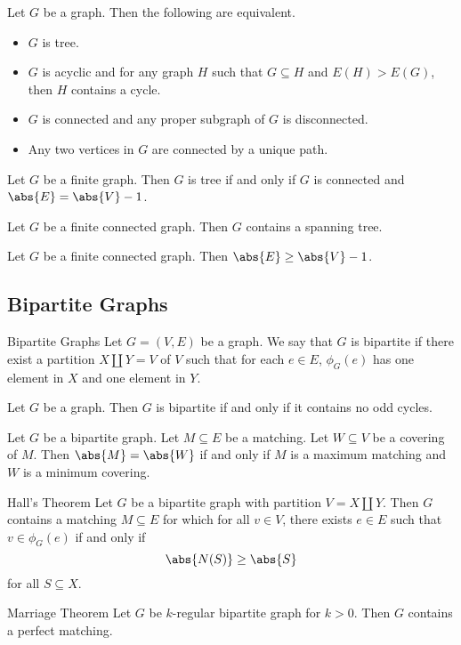 \documentclass[a4paper]{article}
\begin{document}
\begin{prp}{}{} Let $G$ be a graph. Then the following are equivalent. 
\begin{itemize}
\item $G$ is tree. 
\item $G$ is acyclic and for any graph $H$ such that $G\subseteq H$ and $E(H)>E(G)$, then $H$ contains a cycle. 
\item $G$ is connected and any proper subgraph of $G$ is disconnected. 
\item Any two vertices in $G$ are connected by a unique path. 
\end{itemize}
\end{prp}

\begin{lmm}{}{} Let $G$ be a finite graph. Then $G$ is tree if and only if $G$ is connected and $\abs{E}=\abs{V}-1$. 
\end{lmm}

\begin{prp}{}{} Let $G$ be a finite connected graph. Then $G$ contains a spanning tree. 
\end{prp}

\begin{lmm}{}{} Let $G$ be a finite connected graph. Then $\abs{E}\geq\abs{V}-1$. 
\end{lmm}

\subsection{Bipartite Graphs}
\begin{defn}{Bipartite Graphs}{} Let $G=(V,E)$ be a graph. We say that $G$ is bipartite if there exist a partition $X\amalg Y=V$ of $V$ such that for each $e\in E$, $\phi_G(e)$ has one element in $X$ and one element in $Y$. 
\end{defn}

\begin{prp}{}{} Let $G$ be a graph. Then $G$ is bipartite if and only if it contains no odd cycles. 
\end{prp}

\begin{prp}{}{} Let $G$ be a bipartite graph. Let $M\subseteq E$ be a matching. Let $W\subseteq V$ be a covering of $M$. Then $\abs{M}=\abs{W}$ if and only if $M$ is a maximum matching and $W$ is a minimum covering. 
\end{prp}

\begin{thm}{Hall's Theorem}{} Let $G$ be a bipartite graph with partition $V=X\amalg Y$. Then $G$ contains a matching $M\subseteq E$ for which for all $v\in V$, there exists $e\in E$ such that $v\in\phi_G(e)$ if and only if $$\abs{N(S)}\geq\abs{S}$$ for all $S\subseteq X$. 
\end{thm}

\begin{thm}{Marriage Theorem}{} Let $G$ be $k$-regular bipartite graph for $k>0$. Then $G$ contains a perfect matching. 
\end{thm}
\end{document}
